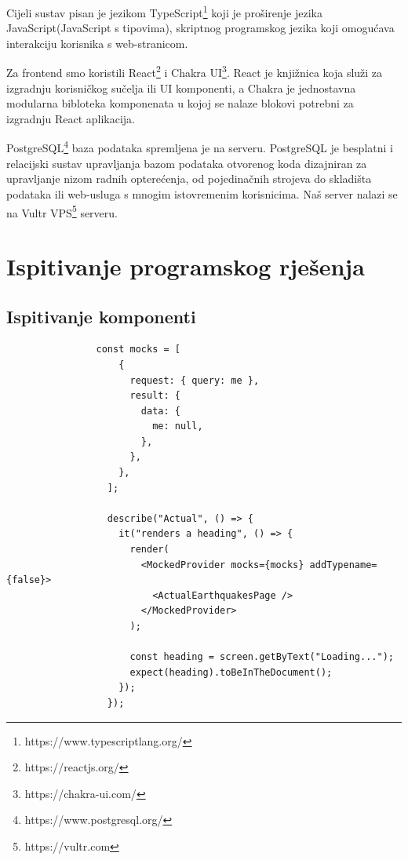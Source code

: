		Cijeli sustav pisan je jezikom TypeScript\footnote{https://www.typescriptlang.org/} koji je proširenje jezika JavaScript(JavaScript s tipovima), skriptnog programskog jezika koji omogućava interakciju korisnika s web-stranicom.
		
		Za frontend smo koristili React\footnote{https://reactjs.org/} i Chakra UI\footnote{https://chakra-ui.com/}. React je knjižnica koja služi za izgradnju korisničkog sučelja ili UI komponenti, a Chakra je jednostavna modularna bibloteka komponenata	u kojoj se nalaze blokovi potrebni za izgradnju React aplikacija.
		
		 PostgreSQL\footnote{https://www.postgresql.org/} baza podataka spremljena je na serveru. PostgreSQL je besplatni i relacijski sustav upravljanja bazom podataka otvorenog koda dizajniran za upravljanje nizom radnih opterećenja, od pojedinačnih strojeva do skladišta podataka ili web-usluga s mnogim istovremenim korisnicima. Naš server nalazi se na Vultr VPS\footnote{https://vultr.com} serveru.
		
			\eject 
		
	
		\section{Ispitivanje programskog rješenja}
			
			\subsection{Ispitivanje komponenti}
			
			\noindent {}
			\begin{lstlisting}
				const mocks = [
					{
					  request: { query: me },
					  result: {
						data: {
						  me: null,
						},
					  },
					},
				  ];
				  
				  describe("Actual", () => {
					it("renders a heading", () => {
					  render(
						<MockedProvider mocks={mocks} addTypename={false}>
						  <ActualEarthquakesPage />
						</MockedProvider>
					  );
				  
					  const heading = screen.getByText("Loading...");
					  expect(heading).toBeInTheDocument();
					});
				  });
			\end{lstlisting}

